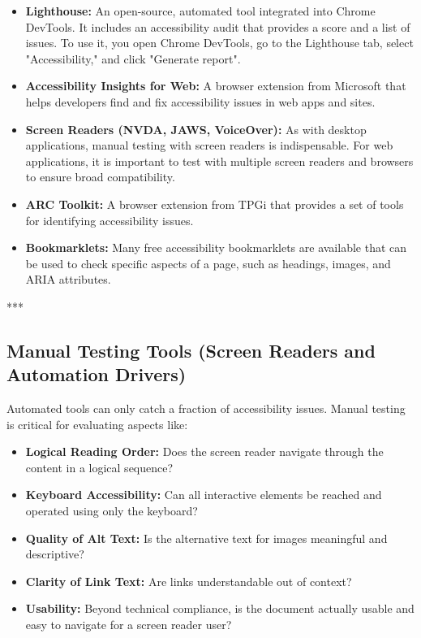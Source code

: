 \begin{itemize}
	\item \textbf{Lighthouse\supercite{Lighthouse}:} An open-source, automated tool integrated into Chrome DevTools. It includes an accessibility audit that provides a score and a list of issues. To use it, you open Chrome DevTools, go to the Lighthouse tab, select "Accessibility," and click "Generate report".
	\item \textbf{Accessibility Insights for Web\supercite{AccessibilityInsights}:} A browser extension from Microsoft that helps developers find and fix accessibility issues in web apps and sites.
	\item \textbf{Screen Readers (NVDA, JAWS, VoiceOver):} As with desktop applications, manual testing with screen readers is indispensable. For web applications, it is important to test with multiple screen readers and browsers to ensure broad compatibility.
	\item \textbf{ARC Toolkit\supercite{ARCToolkit}:} A browser extension from TPGi that provides a set of tools for identifying accessibility issues.
	\item \textbf{Bookmarklets\supercite{A11yProject}:} Many free accessibility bookmarklets are available that can be used to check specific aspects of a page, such as headings, images, and \gls{ARIA} attributes.
\end{itemize}

***

\subsection{Manual Testing Tools (Screen Readers and Automation Drivers)}
\label{sub:manual-testing-tools-screen-readers-and-automation-drivers}

Automated tools can only catch a fraction of accessibility issues. Manual testing is critical for evaluating aspects like:
\begin{itemize}
	\item \textbf{Logical Reading Order:} Does the screen reader navigate through the content in a logical sequence?
	\item \textbf{Keyboard Accessibility:} Can all interactive elements be reached and operated using only the keyboard?
	\item \textbf{Quality of Alt Text:} Is the alternative text for images meaningful and descriptive?
	\item \textbf{Clarity of Link Text:} Are links understandable out of context?
	\item \textbf{Usability:} Beyond technical compliance, is the document actually usable and easy to navigate for a screen reader user?
\end{itemize}
